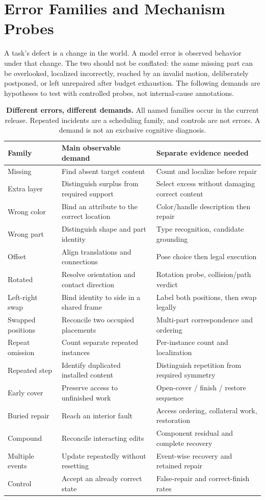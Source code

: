 \documentclass[10pt,twocolumn,letterpaper]{article}
\begin{document}
\section{Error Families and Mechanism Probes}
A task's defect is a change in the world. A model error is observed behavior under that change. The two should not be conflated: the same missing part can be overlooked, localized incorrectly, reached by an invalid motion, deliberately postponed, or left unrepaired after budget exhaustion. The following demands are hypotheses to test with controlled probes, not internal-cause annotations.

\begin{table}[t]\centering\small
\caption{\textbf{Different errors, different demands.} All named families occur in the current release. Repeated incidents are a scheduling family, and controls are not errors. A demand is not an exclusive cognitive diagnosis.}
\begin{tabularx}{\textwidth}{@{}p{}XX@{}}\toprule
Family & Main observable demand & Separate evidence needed\\\midrule
Missing & Find absent target content & Count and localize before repair\\
Extra layer & Distinguish surplus from required support & Select excess without damaging correct content\\
Wrong color & Bind an attribute to the correct location & Color/handle description then repair\\
Wrong part & Distinguish shape and part identity & Type recognition, candidate grounding\\
Offset & Align translations and connections & Pose choice then legal execution\\
Rotated & Resolve orientation and contact direction & Rotation probe, collision/path verdict\\
Left-right swap & Bind identity to side in a shared frame & Label both positions, then swap legally\\
Swapped positions & Reconcile two occupied placements & Multi-part correspondence and ordering\\
Repeat omission & Count separate repeated instances & Per-instance count and localization\\
Repeated step & Identify duplicated installed content & Distinguish repetition from required symmetry\\
Early cover & Preserve access to unfinished work & Open-cover / finish / restore sequence\\
Buried repair & Reach an interior fault & Access ordering, collateral work, restoration\\
Compound & Reconcile interacting edits & Component residual and complete recovery\\
Multiple events & Update repeatedly without resetting & Event-wise recovery and retained repair\\
Control & Accept an already correct state & False-repair and correct-finish rates\\\bottomrule
\end{tabularx}\end{table}
\end{document}
